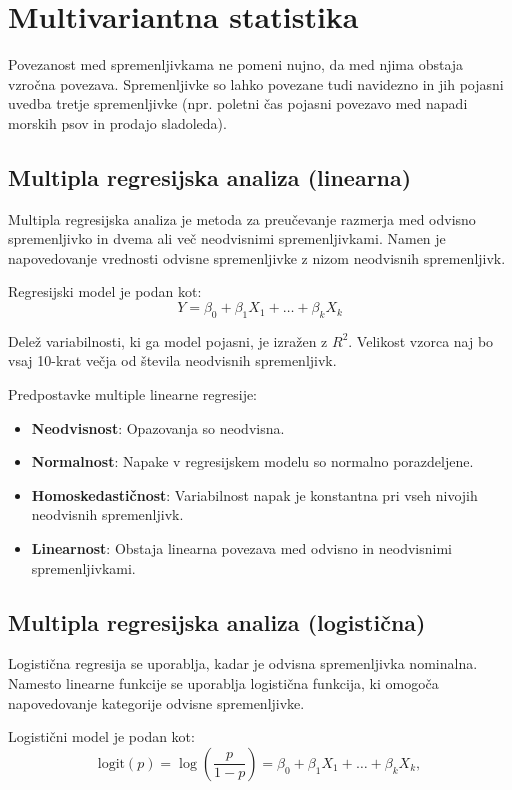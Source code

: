 \section{Multivariantna statistika}

Povezanost med spremenljivkama ne pomeni nujno, da med njima obstaja vzročna povezava. Spremenljivke so lahko povezane tudi navidezno in jih pojasni uvedba tretje spremenljivke (npr. poletni čas pojasni povezavo med napadi morskih psov in prodajo sladoleda).

\subsection*{Multipla regresijska analiza (linearna)}

Multipla regresijska analiza je metoda za preučevanje razmerja med odvisno spremenljivko in dvema ali več neodvisnimi spremenljivkami. Namen je napovedovanje vrednosti odvisne spremenljivke z nizom neodvisnih spremenljivk.

Regresijski model je podan kot:
\[Y = \beta_0 + \beta_1 X_1 + \ldots + \beta_k X_k\]

Delež variabilnosti, ki ga model pojasni, je izražen z $R^2$. Velikost vzorca naj bo vsaj 10-krat večja od števila neodvisnih spremenljivk.

Predpostavke multiple linearne regresije:
\begin{itemize}
    \item \textbf{Neodvisnost}: Opazovanja so neodvisna.
    \item \textbf{Normalnost}: Napake v regresijskem modelu so normalno porazdeljene.
    \item \textbf{Homoskedastičnost}: Variabilnost napak je konstantna pri vseh nivojih neodvisnih spremenljivk.
    \item \textbf{Linearnost}: Obstaja linearna povezava med odvisno in neodvisnimi spremenljivkami.
\end{itemize}

\subsection*{Multipla regresijska analiza (logistična)}

Logistična regresija se uporablja, kadar je odvisna spremenljivka nominalna. Namesto linearne funkcije se uporablja logistična funkcija, ki omogoča napovedovanje kategorije odvisne spremenljivke.

Logistični model je podan kot:
\[\text{logit}(p) = \log\left(\frac{p}{1-p}\right) = \beta_0 + \beta_1 X_1 + \ldots + \beta_k X_k,\]

